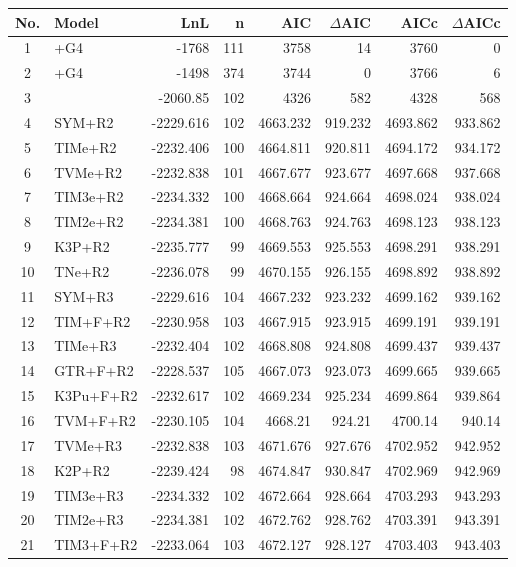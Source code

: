 \singlespacing
\begin{longtable}{clrrrrrr}
	No. & Model & LnL & n & AIC & $\Delta$AIC & AICc & $\Delta$AICc \\ \hline
	1 & \selacDMS+G4 & -1768 & 111 & 3758 & 14 & 3760 & 0 \\ 
	2 & \selac+G4 & -1498 & 374 & 3744 & 0 & 3766 & 6 \\ 
	3 & \phydms & -2060.85 & 102 & 4326 & 582 & 4328 & 568 \\ 
	4 & SYM+R2 & -2229.616 & 102 & 4663.232 & 919.232 & 4693.862 & 933.862 \\ 
	5 & TIMe+R2 & -2232.406 & 100 & 4664.811 & 920.811 & 4694.172 & 934.172 \\ 
	6 & TVMe+R2 & -2232.838 & 101 & 4667.677 & 923.677 & 4697.668 & 937.668 \\ 
	7 & TIM3e+R2 & -2234.332 & 100 & 4668.664 & 924.664 & 4698.024 & 938.024 \\ 
	8 & TIM2e+R2 & -2234.381 & 100 & 4668.763 & 924.763 & 4698.123 & 938.123 \\ 
	9 & K3P+R2 & -2235.777 & 99 & 4669.553 & 925.553 & 4698.291 & 938.291 \\ 
	10 & TNe+R2 & -2236.078 & 99 & 4670.155 & 926.155 & 4698.892 & 938.892 \\ 
	11 & SYM+R3 & -2229.616 & 104 & 4667.232 & 923.232 & 4699.162 & 939.162 \\ 
	12 & TIM+F+R2 & -2230.958 & 103 & 4667.915 & 923.915 & 4699.191 & 939.191 \\ 
	13 & TIMe+R3 & -2232.404 & 102 & 4668.808 & 924.808 & 4699.437 & 939.437 \\ 
	14 & GTR+F+R2 & -2228.537 & 105 & 4667.073 & 923.073 & 4699.665 & 939.665 \\ 
	15 & K3Pu+F+R2 & -2232.617 & 102 & 4669.234 & 925.234 & 4699.864 & 939.864 \\ 
	16 & TVM+F+R2 & -2230.105 & 104 & 4668.21 & 924.21 & 4700.14 & 940.14 \\ 
	17 & TVMe+R3 & -2232.838 & 103 & 4671.676 & 927.676 & 4702.952 & 942.952 \\ 
	18 & K2P+R2 & -2239.424 & 98 & 4674.847 & 930.847 & 4702.969 & 942.969 \\ 
	19 & TIM3e+R3 & -2234.332 & 102 & 4672.664 & 928.664 & 4703.293 & 943.293 \\ 
	20 & TIM2e+R3 & -2234.381 & 102 & 4672.762 & 928.762 & 4703.391 & 943.391 \\ 
	21 & TIM3+F+R2 & -2233.064 & 103 & 4672.127 & 928.127 & 4703.403 & 943.403 \\ 

\end{longtable}

